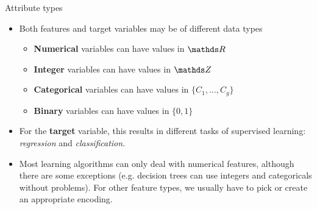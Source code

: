 
\begin{vbframe}{Attribute types}

\begin{itemize}

  \item Both features and target variables may be of different data types 
  
  \begin{itemize}
  
    \item \textbf{Numerical} variables can have values in $\R$
    
    \item \textbf{Integer} variables can have values in $\Z$
    
    \item \textbf{Categorical} variables can have values in $\{C_1,...,C_g\}$
    
    \item \textbf{Binary} variables can have values in $\{0, 1\}$
  
  \end{itemize}
  
  \item For the \textbf{target} variable, this results in different tasks of supervised learning: \textit{regression} and \textit{classification}. 
  
  \item Most learning algorithms can only deal with numerical features,
      although there are some exceptions (e.g. decision trees can use integers and categoricals without problems).
      For other feature types, we usually have to pick or create an
      appropriate encoding.

\end{itemize}

\end{vbframe}


